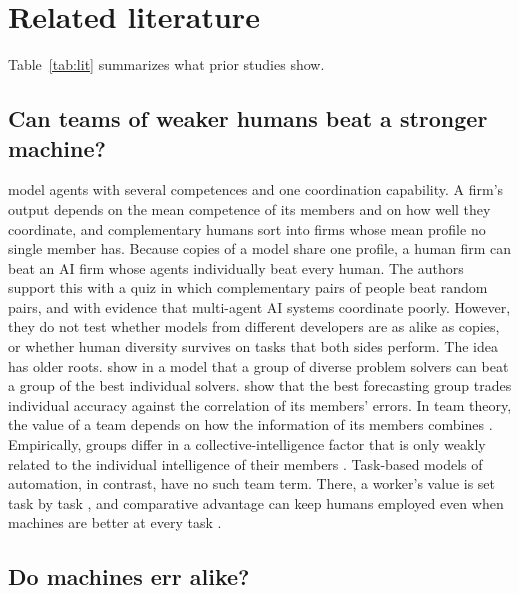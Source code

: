 \documentclass[11pt,a4paper]{article}
\theoremstyle{definition}
\begin{document}
\section{Related literature}\label{sec:literature}

Table~\ref{tab:lit} summarizes what prior studies show.

\subsection{Can teams of weaker humans beat a stronger machine?}

\citet{imas2026organizing} model agents with several competences and one coordination capability. A firm's output depends on the mean competence of its members and on how well they coordinate, and complementary humans sort into firms whose mean profile no single member has. Because copies of a model share one profile, a human firm can beat an AI firm whose agents individually beat every human. The authors support this with a quiz in which complementary pairs of people beat random pairs, and with evidence that multi-agent AI systems coordinate poorly. However, they do not test whether models from different developers are as alike as copies, or whether human diversity survives on tasks that both sides perform. The idea has older roots. \citet{hong2004groups} show in a model that a group of diverse problem solvers can beat a group of the best individual solvers. \citet{lamberson2012optimal} show that the best forecasting group trades individual accuracy against the correlation of its members' errors. In team theory, the value of a team depends on how the information of its members combines \citep{marschak1972economic,prat2002homogeneous}. Empirically, groups differ in a collective-intelligence factor that is only weakly related to the individual intelligence of their members \citep{woolley2010evidence}. Task-based models of automation, in contrast, have no such team term. There, a worker's value is set task by task \citep{acemoglu2018race}, and comparative advantage can keep humans employed even when machines are better at every task \citep{restrepo2026wont}.

\subsection{Do machines err alike?}
\end{document}
